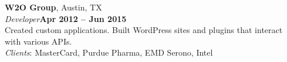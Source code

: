 \documentclass[margin,line]{resume}
\begin{document}
\begin{resume}
\textbf{W2O Group}, Austin, TX
\vspace{2mm}\\
\textsl{Developer}\hfill \textbf{Apr 2012 -- Jun 2015}\vspace{1mm}\\
Created custom applications. Built WordPress sites and plugins that interact with various APIs.\vspace{1mm}\\
\textsl{Clients}: {\small MasterCard, Purdue Pharma, EMD Serono, Intel}



\end{resume}
\end{document}
